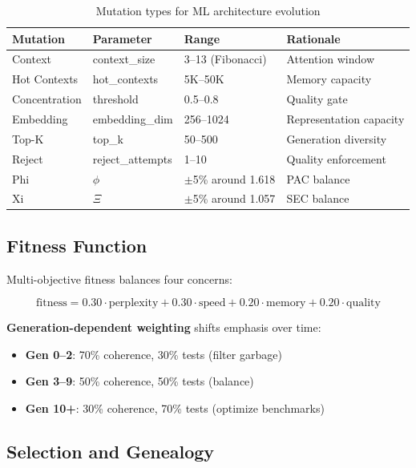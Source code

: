 \documentclass[11pt,a4paper]{article}
\begin{document}
\begin{table}[H]
\centering
\begin{tabular}{llll}
\toprule
\textbf{Mutation} & \textbf{Parameter} & \textbf{Range} & \textbf{Rationale} \\
\midrule
Context & context\_size & 3--13 (Fibonacci) & Attention window \\
Hot Contexts & hot\_contexts & 5K--50K & Memory capacity \\
Concentration & threshold & 0.5--0.8 & Quality gate \\
Embedding & embedding\_dim & 256--1024 & Representation capacity \\
Top-K & top\_k & 50--500 & Generation diversity \\
Reject & reject\_attempts & 1--10 & Quality enforcement \\
Phi & $\phi$ & $\pm$5\% around 1.618 & PAC balance \\
Xi & $\Xi$ & $\pm$5\% around 1.057 & SEC balance \\
\bottomrule
\end{tabular}
\caption{Mutation types for ML architecture evolution}
\end{table}

\subsection{Fitness Function}

Multi-objective fitness balances four concerns:

\begin{equation}
\text{fitness} = 0.30 \cdot \text{perplexity} + 0.30 \cdot \text{speed} + 0.20 \cdot \text{memory} + 0.20 \cdot \text{quality}
\end{equation}

\textbf{Generation-dependent weighting} shifts emphasis over time:
\begin{itemize}
    \item \textbf{Gen 0--2}: 70\% coherence, 30\% tests (filter garbage)
    \item \textbf{Gen 3--9}: 50\% coherence, 50\% tests (balance)
    \item \textbf{Gen 10+}: 30\% coherence, 70\% tests (optimize benchmarks)
\end{itemize}

\subsection{Selection and Genealogy}
\end{document}
